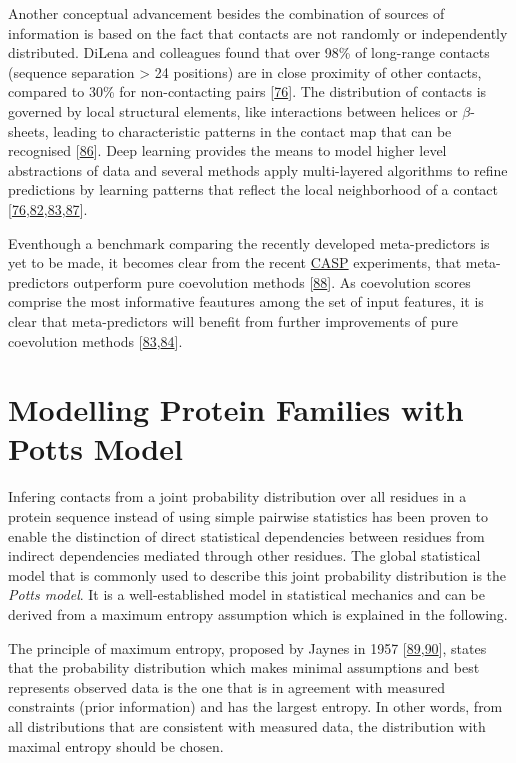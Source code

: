 \documentclass[11pt,a4paper,twoside]{book}
\theoremstyle{definition}
\theoremstyle{definition}
\theoremstyle{remark}
\begin{document}
Another conceptual advancement besides the combination of sources of
information is based on the fact that contacts are not randomly or
independently distributed. DiLena and colleagues found that over 98\% of
long-range contacts (sequence separation \textgreater{} 24 positions)
are in close proximity of other contacts, compared to 30\% for
non-contacting pairs {[}\protect\hyperlink{ref-DiLena2012a}{76}{]}. The
distribution of contacts is governed by local structural elements, like
interactions between helices or \(\beta\)-sheets, leading to
characteristic patterns in the contact map that can be recognised
{[}\protect\hyperlink{ref-Andreani2015a}{86}{]}. Deep learning provides
the means to model higher level abstractions of data and several methods
apply multi-layered algorithms to refine predictions by learning
patterns that reflect the local neighborhood of a contact
{[}\protect\hyperlink{ref-DiLena2012a}{76},\protect\hyperlink{ref-Jones2015a}{82},\protect\hyperlink{ref-Wang2016a}{83},\protect\hyperlink{ref-Skwark2014a}{87}{]}.

Eventhough a benchmark comparing the recently developed meta-predictors
is yet to be made, it becomes clear from the recent
\protect\hyperlink{abbrev}{CASP} experiments, that meta-predictors
outperform pure coevolution methods
{[}\protect\hyperlink{ref-Monastyrskyy2015}{88}{]}. As coevolution
scores comprise the most informative feautures among the set of input
features, it is clear that meta-predictors will benefit from further
improvements of pure coevolution methods
{[}\protect\hyperlink{ref-Wang2016a}{83},\protect\hyperlink{ref-Stahl2017}{84}{]}.

\section{Modelling Protein Families with Potts Model}\label{maxent}

Infering contacts from a joint probability distribution over all
residues in a protein sequence instead of using simple pairwise
statistics has been proven to enable the distinction of direct
statistical dependencies between residues from indirect dependencies
mediated through other residues. The global statistical model that is
commonly used to describe this joint probability distribution is the
\emph{Potts model}. It is a well-established model in statistical
mechanics and can be derived from a maximum entropy assumption which is
explained in the following.

The principle of maximum entropy, proposed by Jaynes in 1957
{[}\protect\hyperlink{ref-Jaynes1957a}{89},\protect\hyperlink{ref-Jaynes1957b}{90}{]},
states that the probability distribution which makes minimal assumptions
and best represents observed data is the one that is in agreement with
measured constraints (prior information) and has the largest entropy. In
other words, from all distributions that are consistent with measured
data, the distribution with maximal entropy should be chosen.
\end{document}
